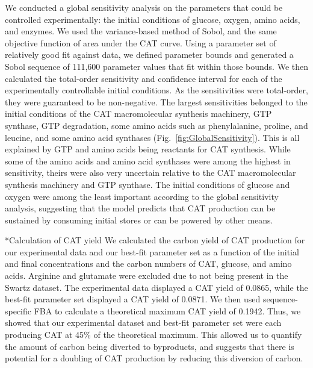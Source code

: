 \documentclass[12pt]{article}
\makeatletter
\renewcommand\subsection{\@startsection
	{subsection}{2}{0mm}
	{-0.05in}
	{-0.5\baselineskip}
	{\normalfont\normalsize\bfseries}}
\makeatother
\begin{document}
We conducted a global sensitivity analysis on the parameters that could be controlled experimentally: the initial conditions of glucose, oxygen, amino acids, and enzymes.
We used the variance-based method of Sobol, and the same objective function of area under the CAT curve.
Using a parameter set of relatively good fit against data, we defined parameter bounds and generated a Sobol sequence of 111,600 parameter values that fit within those bounds.
We then calculated the total-order sensitivity and confidence interval for each of the experimentally controllable initial conditions.
As the sensitivities were total-order, they were guaranteed to be non-negative.
The largest sensitivities belonged to the initial conditions of the CAT macromolecular synthesis machinery, GTP synthase, GTP degradation, some amino acids such as phenylalanine, proline, and leucine, and some amino acid synthases (Fig.~\ref{fig:GlobalSensitivity}).
This is all explained by GTP and amino acids being reactants for CAT synthesis.
While some of the amino acids and amino acid synthases were among the highest in sensitivity, theirs were also very uncertain relative to the CAT macromolecular synthesis machinery and GTP synthase.
The initial conditions of glucose and oxygen were among the least important according to the global sensitivity analysis, suggesting that the model predicts that CAT production can be sustained by consuming initial stores or can be powered by other means.

\subsection*{Calculation of CAT yield}
We calculated the carbon yield of CAT production for our experimental data and our best-fit parameter set as a function of the initial and final concentrations and the carbon numbers of CAT, glucose, and amino acids.
Arginine and glutamate were excluded due to not being present in the Swartz dataset.
The experimental data displayed a CAT yield of 0.0865, while the best-fit parameter set displayed a CAT yield of 0.0871.
We then used sequence-specific FBA to calculate a theoretical maximum CAT yield of 0.1942.
Thus, we showed that our experimental dataset and best-fit parameter set were each producing CAT at 45\% of the theoretical maximum.
This allowed us to quantify the amount of carbon being diverted to byproducts, and suggests that there is potential for a doubling of CAT production by reducing this diversion of carbon.

\clearpage
\end{document}
